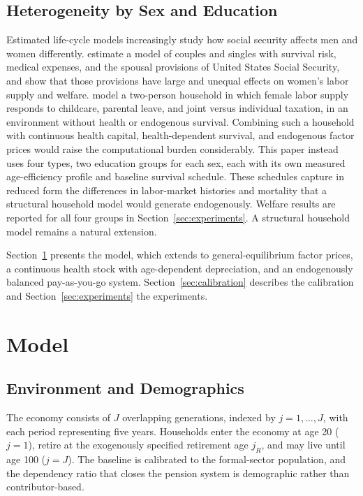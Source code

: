 \documentclass[12pt,a4paper]{article}
\begin{document}
\subsection{Heterogeneity by Sex and Education}
\label{subsec:lit_gender}

Estimated life-cycle models increasingly study how social security affects men and women differently. \citet{BorellaDeNardiYang2023} estimate a model of couples and singles with survival risk, medical expenses, and the spousal provisions of United States Social Security, and show that those provisions have large and unequal effects on women's labor supply and welfare. \citet{FehrKindermann2018} model a two-person household in which female labor supply responds to childcare, parental leave, and joint versus individual taxation, in an environment without health or endogenous survival. Combining such a household with continuous health capital, health-dependent survival, and endogenous factor prices would raise the computational burden considerably. This paper instead uses four types, two education groups for each sex, each with its own measured age-efficiency profile and baseline survival schedule. These schedules capture in reduced form the differences in labor-market histories and mortality that a structural household model would generate endogenously. Welfare results are reported for all four groups in Section~\ref{sec:experiments}. A structural household model remains a natural extension.

\bigskip
Section~\ref{sec:model} presents the model, which extends \citet{CortesEtAl2024} to general-equilibrium factor prices, a continuous health stock with age-dependent depreciation, and an endogenously balanced pay-as-you-go system. Section~\ref{sec:calibration} describes the calibration and Section~\ref{sec:experiments} the experiments.

\section{Model}
\label{sec:model}

\subsection{Environment and Demographics}
\label{subsec:environment}

The economy consists of $J$ overlapping generations, indexed by $j = 1, \ldots, J$, with each period representing five years. Households enter the economy at age 20 ($j = 1$), retire at the exogenously specified retirement age $j_R$, and may live until age 100 ($j = J$). The baseline is calibrated to the formal-sector population, and the dependency ratio that closes the pension system is demographic rather than contributor-based.
\end{document}
